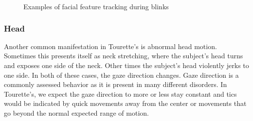 \documentclass[11pt]{article}
\begin{document}
\begin{figure}%
    \centering
    \qquad
    \caption{Examples of facial feature tracking during blinks}%
    \label{ticgraph}%
\end{figure}

\subsubsection{Head}
Another common manifestation in Tourette's is abnormal head motion. Sometimes this presents itself as neck stretching, where the subject's head turns and exposes one side of the neck. Other times the subject's head violently jerks to one side. In both of these cases, the gaze direction changes. Gaze direction is a commonly assessed behavior as it is present in many different disorders. In Tourette's, we expect the gaze direction to more or less stay constant and tics would be indicated by quick movements away from the center or movements that go beyond the normal expected range of motion.
\end{document}
